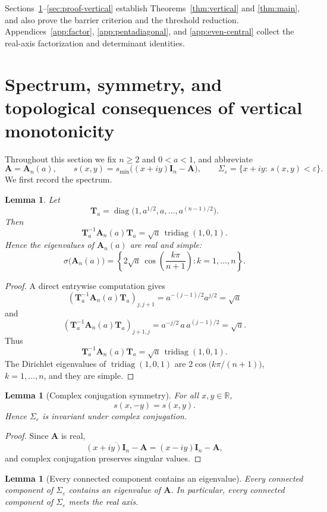 \documentclass[11pt]{article}
\numberwithin{equation}{section}
\newtheorem{lemma}[theorem]{Lemma}
\newcommand{\R}{\mathbb R}
\newcommand{\A}{\mathbf A}
\newcommand{\I}{\mathbf I}
\newcommand{\Tmat}{\mathbf T}
\newcommand{\tridiag}{\operatorname{tridiag}}
\newcommand{\diag}{\operatorname{diag}}
\newcommand{\smin}{s_{\min}}
\begin{document}
Sections~\ref{sec:topology}--\ref{sec:proof-vertical} establish
Theorems~\ref{thm:vertical} and \ref{thm:main}, and also prove the
barrier criterion and the threshold reduction.  Appendices~\ref{app:factor},
\ref{app:pentadiagonal}, and \ref{app:even-central} collect the real-axis
factorization and determinant identities.

\section{Spectrum, symmetry, and topological consequences of vertical monotonicity}
\label{sec:topology}

Throughout this section we fix \(n\ge2\) and \(0<a<1\), and abbreviate
\[
\A=\A_n(a),\qquad
s(x,y)=\smin\!\bigl((x+iy)\I_n-\A\bigr),\qquad
\Sigma_\varepsilon=\{x+iy:\ s(x,y)<\varepsilon\}.
\]
We first record the spectrum.

\begin{lemma}\label{lem:spectrum}
Let
\[
\Tmat_a=
\diag\!\bigl(1,a^{1/2},a,\dots,a^{(n-1)/2}\bigr).
\]
Then
\[
\Tmat_a^{-1}\A_n(a)\Tmat_a
=
\sqrt a\,
\tridiag(1,0,1).
\]
Hence the eigenvalues of \(\A_n(a)\) are real and simple:
\[
\sigma\!\bigl(\A_n(a)\bigr)
=
\left\{
2\sqrt a\,\cos\!\left(\frac{k\pi}{n+1}\right):
k=1,\dots,n
\right\}.
\]
\end{lemma}

\begin{proof}
A direct entrywise computation gives
\[
(\Tmat_a^{-1}\A_n(a)\Tmat_a)_{j,j+1}
=
a^{-(j-1)/2}a^{j/2}=\sqrt a
\]
and
\[
(\Tmat_a^{-1}\A_n(a)\Tmat_a)_{j+1,j}
=
a^{-j/2}\,a\,a^{(j-1)/2}=\sqrt a.
\]
Thus
\[
\Tmat_a^{-1}\A_n(a)\Tmat_a
=
\sqrt a\,\tridiag(1,0,1).
\]
The Dirichlet eigenvalues of \(\tridiag(1,0,1)\) are
\(
2\cos\!\bigl(k\pi/(n+1)\bigr)
\),
\(k=1,\dots,n\), and they are simple.
\end{proof}

\begin{lemma}[Complex conjugation symmetry]\label{lem:conj}
For all \(x,y\in\R\),
\[
s(x,-y)=s(x,y).
\]
Hence \(\Sigma_\varepsilon\) is invariant under complex conjugation.
\end{lemma}

\begin{proof}
Since \(\A\) is real,
\[
\overline{(x+iy)\I_n-\A}=(x-iy)\I_n-\A,
\]
and complex conjugation preserves singular values.
\end{proof}

\begin{lemma}[Every connected component contains an eigenvalue]
\label{lem:component-eigenvalue}
Every connected component of \(\Sigma_\varepsilon\) contains an eigenvalue of \(\A\).
In particular, every connected component of \(\Sigma_\varepsilon\) meets the real axis.
\end{lemma}
\end{document}
